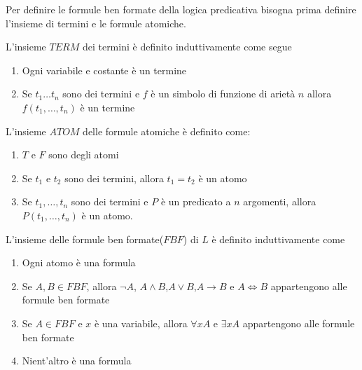Per definire le formule ben formate della logica predicativa bisogna prima definire
l'insieme di termini e le formule atomiche.
\begin{defi}
    L'insieme $TERM$ dei termini è definito induttivamente come segue
    \begin{enumerate}
        \item Ogni variabile e costante è un termine
        \item Se $t_1 \dots t_n$ sono dei termini e $f$ è un simbolo di funzione di arietà $n$
              allora $f(t_1,\dots,t_n)$ è un termine
    \end{enumerate}
\end{defi}
\begin{defi}
    L'insieme $ATOM$ delle formule atomiche è definito come:
    \begin{enumerate}
        \item $T$ e $F$ sono degli atomi
        \item Se $t_1$ e $t_2$ sono dei termini, allora $t_1 = t_2$ è un atomo
        \item Se $t_1,\dots,t_n$ sono dei termini e $P$ è un predicato a $n$ argomenti,
              allora $P(t_1,\dots,t_n)$ è un atomo.
    \end{enumerate}
\end{defi}
\begin{defi}
    L'insieme delle formule ben formate($FBF$) di $L$ è definito induttivamente come
    \begin{enumerate}
        \item Ogni atomo è una formula
        \item Se $A,B \in FBF$, allora $\neg A$, $A \land B$,$A \lor B$,$A \rightarrow B$
              e $A \iff B$ appartengono alle formule ben formate
        \item Se $A \in FBF$ e $x$ è una variabile, allora $\forall x A$ e $\exists x A$
              appartengono alle formule ben formate
        \item Nient'altro è una formula
    \end{enumerate}
\end{defi}

